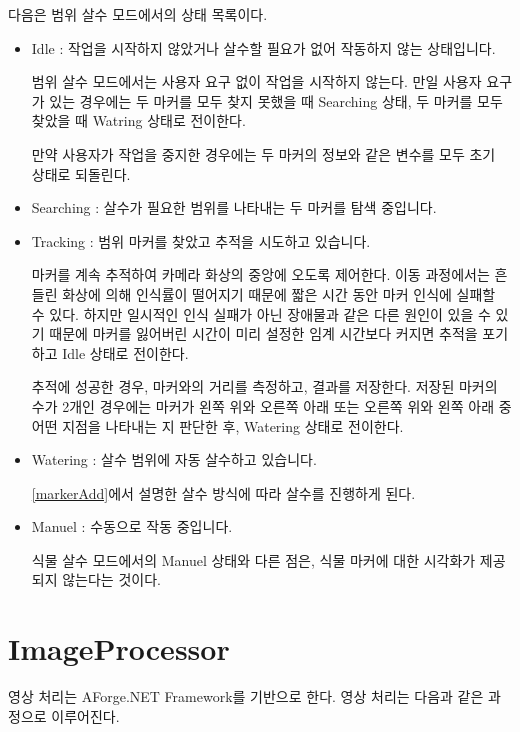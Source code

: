 \documentclass[chapter,11pt,oneside,openany]{xoblivoir}
\begin{document}
다음은 범위 살수 모드에서의 상태 목록이다.
\begin{itemize}
\item Idle : 작업을 시작하지 않았거나 살수할 필요가 없어 작동하지 않는 상태입니다.

범위 살수 모드에서는 사용자 요구 없이 작업을 시작하지 않는다. 만일 사용자 요구가 있는 경우에는
두 마커를 모두 찾지 못했을 때 Searching 상태, 두 마커를 모두 찾았을 때 Watring 상태로 전이한다.

만약 사용자가 작업을 중지한 경우에는 두 마커의 정보와 같은 변수를 모두 초기 상태로
되돌린다.

\item Searching : 살수가 필요한 범위를 나타내는 두 마커를 탐색 중입니다.

\item Tracking : 범위 마커를 찾았고 추적을 시도하고 있습니다.

마커를 계속 추적하여 카메라 화상의 중앙에 오도록 제어한다.
이동 과정에서는 흔들린 화상에 의해 인식률이 떨어지기 때문에 짧은 시간 동안 마커 인식에 실패할 수 있다.
하지만 일시적인 인식 실패가 아닌 장애물과 같은 다른 원인이 있을 수 있기 때문에
마커를 잃어버린 시간이 미리 설정한 임계 시간보다 커지면 추적을 포기하고 Idle 상태로 전이한다.

추적에 성공한 경우, 마커와의 거리를 측정하고, 결과를 저장한다.
저장된 마커의 수가 2개인 경우에는 마커가 왼쪽 위와 오른쪽 아래 또는 오른쪽 위와
왼쪽 아래 중 어떤 지점을 나타내는 지 판단한 후, Watering 상태로 전이한다.

\item Watering : 살수 범위에 자동 살수하고 있습니다.

\ref{markerAdd}에서 설명한 살수 방식에 따라 살수를 진행하게 된다.

\item Manuel : 수동으로 작동 중입니다.

식물 살수 모드에서의 Manuel 상태와 다른 점은, 식물 마커에 대한 시각화가 제공되지 않는다는 것이다.

\end{itemize}

\section{ImageProcessor}

영상 처리는 AForge.NET Framework를 기반으로 한다. 영상 처리는 다음과 같은 과정으로 이루어진다.
\end{document}
